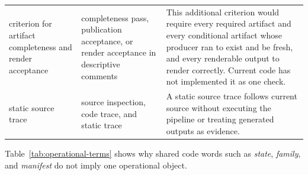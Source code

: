 \documentclass[11pt]{article}
\begin{document}
\begin{longtable}{@{}>{\raggedright\arraybackslash}p{}
  >{\raggedright\arraybackslash}p{}
  >{\raggedright\arraybackslash}p{}@{}}
criterion for artifact completeness and render acceptance & completeness pass,
publication acceptance, or render acceptance in descriptive comments & This
additional criterion would require every required artifact and every
conditional artifact whose producer ran to exist and be fresh, and every
renderable output to render correctly. Current code has not implemented it as
one check.\\
static source trace & source inspection, code trace, and static trace & A static
source trace follows current source without executing
the pipeline or treating generated outputs as evidence.\\
\bottomrule
\end{longtable}
\normalsize

Table~\ref{tab:operational-terms} shows why shared code words such as
\emph{state}, \emph{family}, and \emph{manifest} do not imply one operational
object.
\end{document}
